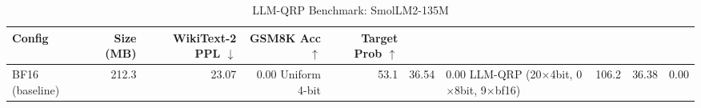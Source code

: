 \begin{table}[h]
  \centering
  \caption{LLM-QRP Benchmark: SmolLM2-135M}
  \label{tab:llm-qrp-benchmark}
  \begin{tabular}{lrrrr}
    \toprule
    \textbf{Config} & \textbf{Size (MB)} & \textbf{WikiText-2 PPL $\downarrow$} & \textbf{GSM8K Acc $\uparrow$} & \textbf{Target Prob $\uparrow$} \\
    \midrule
    BF16 (baseline) & 212.3 & 23.07 & 0.00%
    Uniform 4-bit & 53.1 & 36.54 & 0.00%
    LLM-QRP (20$\times$4bit, 0$\times$8bit, 9$\times$bf16) & 106.2 & 36.38 & 0.00%
    \bottomrule
  \end{tabular}
\end{table}
